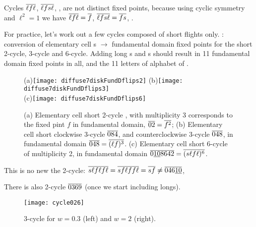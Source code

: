 Cycles ${\overline{\ell f\ell}}$,
${\overline{\ell fs\ell}}$,
\etc, are not distinct fixed points, because using cyclic symmetry and
$\ell^2 =1$ we have
 ${\overline{\ell f\ell}}={\overline{f}}$,
${\overline{\ell fs\ell}}={\overline{fs}}$, \etc.


For practice, let's work out a
few  cycles composed of short flights only.
: conversion of elementary cell \po s $\to$
fundamental domain fixed points for the short 2-cycle, 3-cycle and
6-cycle.
Adding long \po s and \rpo s should result in 11 fundamental domain fixed
points in all, and the 11 letters of alphabet of .

\begin{figure}
\begin{center}
(a)\texttt{[image: diffuse7diskFundDflips2]}
(b)\texttt{[image: diffuse7diskFundDflips3]}
\\
(c)\texttt{[image: diffuse7diskFundDflips6]}
\end{center}
\caption{
(a) Elementary cell short 2-cycle , with multiplicity 3 corresponds to
the fixed pint $f$ in fundamental domain, ${\overline{02}}={\overline{f^2}}$;
(b) Elementary cell short clockwise 3-cycle ${\overline{084}}$, and
counterclockwise 3-cycle ${\overline{048}}$, in
fundamental domain ${\overline{048}}={\overline{(\ell f)^3}}$.
(c) Elementary cell short 6-cycle of multiplicity 2, in
fundamental domain ${\overline{0\underline{10}8642}}={\overline{(s\ell f\ell )^6}}$.
    }
\label{7diskFundDflips2A}
\end{figure}

This is no new the 2-cycle:
$ {\overline{s \ell f \ell f \ell}}
= {\overline{s f \ell f f \ell}}
= {\overline{s f}}
\neq {\ensuremath{\overline{046\underline{10}}}}$,

There is also 2-cycle ${\overline{0369}}$ (once we start including longs).

\begin{figure}
\texttt{[image: cycle026]}
\caption{3-cycle  for $w=0.3$ (left) and $w=2$ (right). }
\label{fig:cycle026A}
\end{figure}

